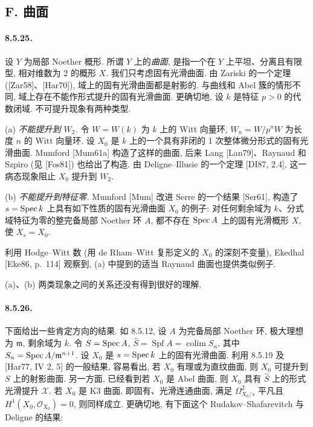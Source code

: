 \subsection*{F. 曲面}
\paragraph{8.5.25.}
设 $Y$ 为局部 Noether 概形. 所谓 $Y$ 上的\emph{曲面}, 是指一个在 $Y$ 上平坦、分离且有限型, 相对维数为 2 的概形 $X$. 我们只考虑固有光滑曲面. 由 Zariski 的一个定理 ([Zar58]、[Har70]), 域上的固有光滑曲面都是射影的. 与曲线和 Abel 簇的情形不同, 域上存在不能作形式提升的固有光滑曲面. 更确切地, 设 $k$ 是特征 $p>0$ 的代数闭域. 不可提升现象有两种类型.

(a) \emph{不能提升到 $W_2$.} 令 $W=W(k)$ 为 $k$ 上的 Witt 向量环, $W_n=W/p^nW$ 为长度 $n$ 的 Witt 向量环. 设 $X_0$ 是 $k$ 上的一个具有非闭的 1 次整体微分形式的固有光滑曲面. Mumford [Mum61a] 构造了这样的曲面, 后来 Lang [Lan79]、Raynaud 和 Szpiro (见 [Fos81]) 也给出了构造. 由 Deligne--Illusie 的一个定理 [DI87, 2.4], 这一病态现象阻止 $X_0$ 提升到 $W_2$.

(b) \emph{不能提升到特征零.} Mumford [Mum] 改进 Serre 的一个结果 [Ser61], 构造了 $s=\operatorname{Spec} k$ 上具有如下性质的固有光滑曲面 $X_0$ 的例子: 对任何剩余域为 $k$、分式域特征为零的整完备局部 Noether 环 $A$, 都不存在 $\operatorname{Spec} A$ 上的固有光滑概形 $X$, 使 $X_s=X_0$.

利用 Hodge--Witt 数 (用 de Rham--Witt 复形定义的 $X_0$ 的深刻不变量),
Ekedhal [Eke86, p.~114] 观察到, (a) 中提到的适当 Raynaud 曲面也提供类似例子.

(a)、(b) 两类现象之间的关系还没有得到很好的理解.

\paragraph{8.5.26.}
下面给出一些肯定方向的结果. 如 8.5.12, 设 $A$ 为完备局部 Noether 环, 极大理想为 $\mathfrak m$, 剩余域为 $k$. 令 $S=\operatorname{Spec} A$, $\widehat S=\operatorname{Spf}A=\operatorname{colim}S_n$, 其中 $S_n=\operatorname{Spec} A/\mathfrak m^{n+1}$. 设 $X_0$ 是 $s=\operatorname{Spec} k$ 上的固有光滑曲面. 利用 8.5.19 及 [Har77, IV 2, 5] 的一般结果, 容易看出, 若 $X_0$ 有理或为直纹曲面, 则 $X_0$ 可提升到 $S$ 上的射影曲面. 另一方面, 已经看到若 $X_0$ 是 Abel 曲面, 则 $X_0$ 具有 $\widehat S$ 上的形式光滑提升 $\mathcal X$. 若 $X_0$ 是 K3 曲面, 即固有、光滑连通曲面, 满足 $\Omega^2_{X_0/s}$ 平凡且 $H^1(X_0,\mathcal O_{X_0})=0$, 则同样成立. 更确切地, 有下面这个 Rudakov--Shafarevitch 与 Deligne 的结果:


